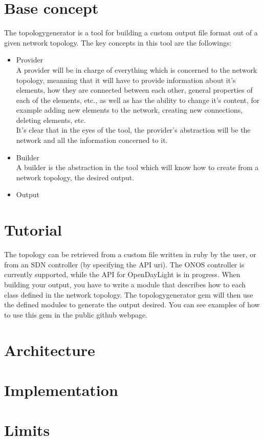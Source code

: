 \section{Base concept}

The topologygenerator is a tool for building a custom output file format out of a given network topology. The key concepts in this tool are the followings:
\begin{itemize}
\item Provider \\
A provider will be in charge of everything which is concerned to the network topology, meanning that it will have to provide information about it's elements, how they are connected between each other, general properties of each of the elements, etc., as well as has the ability to change it's content, for example adding new elements to the network, creating new connections, deleting elements, etc.\\
It's clear that in the eyes of the tool, the provider's abstraction will be the network and all the information concerned to it.

\item Builder \\
A builder is the abstraction in the tool which will know how to create from a network topology, the desired output. 

\item Output \\

\end{itemize}

\section{Tutorial}

The topology can be retrieved from a custom file written in ruby by the user, or from an SDN controller (by specifying the API uri). The ONOS controller is currently supported, while the API for OpenDayLight is in progress. When building your output, you have to write a module that describes how to each class defined in the network topology. The topologygenerator gem will then use the defined modules to generate the output desired. You can see examples of how to use this gem in the public github webpage.

\section{Architecture}

\section{Implementation}

\section{Limits}